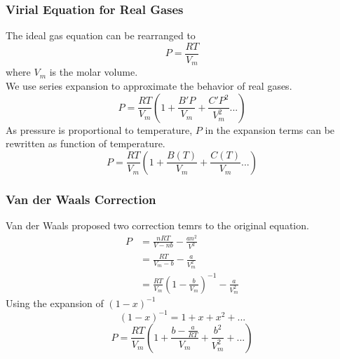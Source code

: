 \documentclass[letterpaper]{article}
\begin{document}
\subsubsection*{Virial Equation for Real Gases}
The ideal gas equation can be rearranged to
\begin{equation*}
    P=\frac{RT}{V_m}
\end{equation*}
where $V_m$ is the molar volume.\\
We use series expansion to approximate the behavior of real gases.
\begin{equation*}
    P=\frac{RT}{V_m}\left(1 + \frac{B'P}{V_m} + \frac{C'P^2}{V_m^2} ...\right)
\end{equation*}
As pressure is proportional to temperature, $P$ in the expansion terms can be rewritten as function of temperature.
\begin{equation*}
    P=\frac{RT}{V_m}\left(1+\frac{B(T)}{V_m}+\frac{C(T)}{V_m}...\right)
\end{equation*}
\subsubsection*{Van der Waals Correction}
Van der Waals proposed two correction temrs to the original equation.
\begin{equation*}
    \begin{aligned}
        P & =\frac{nRT}{V-nb}-\frac{an^2}{V^2}                               \\
          & =\frac{RT}{V_m-b}-\frac{a}{V_m^2}                                \\
          & =\frac{RT}{V_m}\left(1-\frac{b}{V_m}\right)^{-1}-\frac{a}{V_m^2}
    \end{aligned}
\end{equation*}
Using the expansion of $(1-x)^{-1}$
\begin{equation*}
    (1-x)^{-1}=1+x+x^2+...
\end{equation*}
\begin{equation*}
    P=\frac{RT}{V_m}\left(1+\frac{b-\frac{a}{RT}}{V_m}+\frac{b^2}{V_m^2}+...\right)
\end{equation*}
\end{document}
